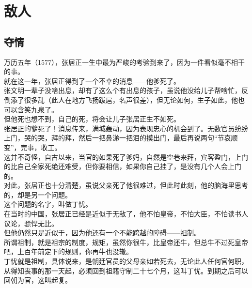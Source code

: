 \section{敌人}
\ifnum{}
	\begin{multicols}{\theparacolNo}
\fi
\subsection{夺情}
万历五年（1577），张居正一生中最为严峻的考验到来了，因为一件看似毫不相干的事。\\

就在这一年，张居正得到了一个不幸的消息——他爹死了。\\

张文明一辈子没啥出息，却有了这么个有出息的孩子，虽说他没给儿子帮啥忙，反倒添了很多乱（此人在地方飞扬跋扈，名声很差），但无论如何，生子如此，他也可以含笑九泉了。\\

但他死也想不到，自己的死，将会让儿子张居正生不如死。\\

张居正的爹死了！消息传来，满城轰动，因为表现忠心的机会到了。无数官员纷纷上门，哭的哭，拜的拜，然后一把鼻涕一把泪的摸出门，最后再说两句“节哀顺变”，完事，收工。\\

这并不奇怪，自古以来，当官的如果死了爹妈，自然是空巷来拜，宾客盈门，上门的比自己全家死绝还难受，但你要相信，如果你自己挂了，是没有几个人会上门的。\\

对此，张居正也十分清楚，虽说父亲死了他很难过，但此时此刻，他的脑海里思考的，却是另一个问题。\\

这个问题的名字，叫做丁忧。\\

在当时的中国，张居正已经是近似于无敌了，他不怕皇帝，不怕大臣，不怕读书人议论，骠悍无比。\\

但他仍然只是近似于，因为他还有一个不能跨越的障碍——祖制。\\

所谓祖制，就是祖宗的制度，规矩，虽然你很牛，比皇帝还牛，但总牛不过死皇帝吧，上百年前定下的规则，你再牛也没辙。\\

丁忧就是祖制，具体说来，是朝廷官员的父母亲如若死去，无论此人任何官何职，从得知丧事的那一天起，必须回到祖籍守制二十七个月，这叫丁忧。到期之后可以回朝为官，这叫起复。\\


\end{multicols}
